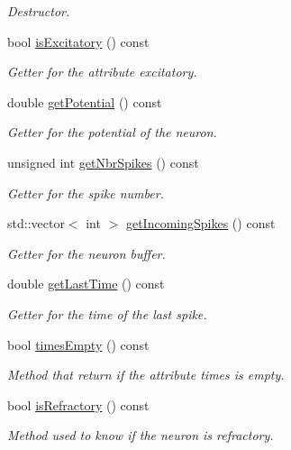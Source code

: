 \begin{DoxyCompactItemize}
\begin{DoxyCompactList}\small\item\em Destructor. \end{DoxyCompactList}\item 
bool \hyperlink{classNeuron_a65f5868f9a2ddc2414a5880f28b76d4c}{is\-Excitatory} () const 
\begin{DoxyCompactList}\small\item\em Getter for the attribute excitatory. \end{DoxyCompactList}\item 
double \hyperlink{classNeuron_ae2bc004a58621da0d1c51591400ca87d}{get\-Potential} () const 
\begin{DoxyCompactList}\small\item\em Getter for the potential of the neuron. \end{DoxyCompactList}\item 
unsigned int \hyperlink{classNeuron_a3e4f3df99d93d7cf49e7be0a76709a20}{get\-Nbr\-Spikes} () const 
\begin{DoxyCompactList}\small\item\em Getter for the spike number. \end{DoxyCompactList}\item 
std\-::vector$<$ int $>$ \hyperlink{classNeuron_a8bd368e9d24ad7ef437fc8cd89a6f26f}{get\-Incoming\-Spikes} () const 
\begin{DoxyCompactList}\small\item\em Getter for the neuron buffer. \end{DoxyCompactList}\item 
double \hyperlink{classNeuron_accc67ae50423870fe66ca29c283ae058}{get\-Last\-Time} () const 
\begin{DoxyCompactList}\small\item\em Getter for the time of the last spike. \end{DoxyCompactList}\item 
bool \hyperlink{classNeuron_aac0f0f02eaefe9e272804ded725a1284}{times\-Empty} () const 
\begin{DoxyCompactList}\small\item\em Method that return if the attribute times is empty. \end{DoxyCompactList}\item 
bool \hyperlink{classNeuron_aa40fbb2b025efb1db420da32e16741c1}{is\-Refractory} () const 
\begin{DoxyCompactList}\small\item\em Method used to know if the neuron is refractory. \end{DoxyCompactList}\item 

\end{DoxyCompactItemize}
